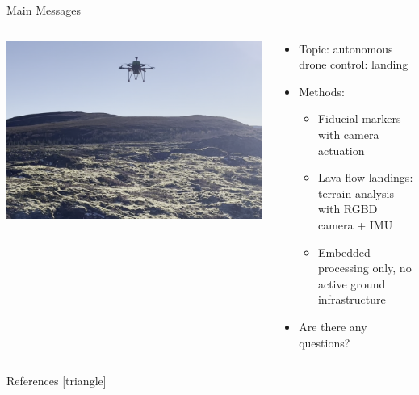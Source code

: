 \documentclass[aspectratio=169]{beamer}
\begin{document}
\begin{frame}{Main Messages}
\begin{columns}
	\begin{column}{0.4\textwidth}
		\includegraphics[width=\textwidth]{./images/depth_drone_flying}
	\end{column}
	\begin{column}{0.6\textwidth}
	\begin{itemize}
		\item Topic: autonomous drone control: landing
		\item Methods:
		\begin{itemize}
			\item Fiducial markers with camera actuation
			\item Lava flow landings: terrain analysis with RGBD camera + IMU
			\item Embedded processing only, no active ground infrastructure
		\end{itemize}
	\item Are there any questions?
	\end{itemize}
	\end{column}
\end{columns}
\end{frame}

\begin{frame}{References}
	[triangle]
	
	
\end{frame}
\end{document}
